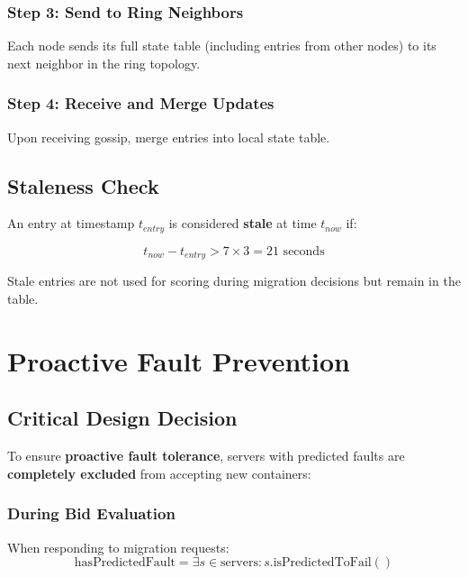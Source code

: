 \documentclass[12pt,a4paper]{article}
\begin{document}
\subsubsection{Step 3: Send to Ring Neighbors}

Each node sends its full state table (including entries from other nodes) to its next neighbor in the ring topology.

\subsubsection{Step 4: Receive and Merge Updates}

Upon receiving gossip, merge entries into local state table.

\subsection{Staleness Check}

An entry at timestamp $t_{entry}$ is considered \textbf{stale} at time $t_{now}$ if:

\begin{equation}
    t_{now} - t_{entry} > 7 \times 3 = 21 \text{ seconds}
\end{equation}

Stale entries are not used for scoring during migration decisions but remain in the table.

\section{Proactive Fault Prevention}

\subsection{Critical Design Decision}

To ensure \textbf{proactive fault tolerance}, servers with predicted faults are \textbf{completely excluded} from accepting new containers:

\subsubsection{During Bid Evaluation}

When responding to migration requests:
\begin{equation}
    \text{hasPredictedFault} = \exists s \in \text{servers} : s.\text{isPredictedToFail}()
\end{equation}
\end{document}
